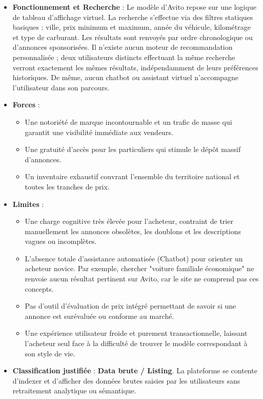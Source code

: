 \documentclass[11pt,a4paper]{article}
\begin{document}
\begin{itemize}
    \item \textbf{Fonctionnement et Recherche} : Le modèle d'Avito repose sur une logique de tableau d'affichage virtuel. La recherche s'effectue via des filtres statiques basiques : ville, prix minimum et maximum, année du véhicule, kilométrage et type de carburant. Les résultats sont renvoyés par ordre chronologique ou d'annonces sponsorisées. Il n'existe aucun moteur de recommandation personnalisée ; deux utilisateurs distincts effectuant la même recherche verront exactement les mêmes résultats, indépendamment de leurs préférences historiques. De même, aucun chatbot ou assistant virtuel n'accompagne l'utilisateur dans son parcours.
    \item \textbf{Forces} : 
    \begin{itemize}
        \item Une notoriété de marque incontournable et un trafic de masse qui garantit une visibilité immédiate aux vendeurs.
        \item Une gratuité d'accès pour les particuliers qui stimule le dépôt massif d'annonces.
        \item Un inventaire exhaustif couvrant l'ensemble du territoire national et toutes les tranches de prix.
    \end{itemize}
    \item \textbf{Limites} :
    \begin{itemize}
        \item Une charge cognitive très élevée pour l'acheteur, contraint de trier manuellement les annonces obsolètes, les doublons et les descriptions vagues ou incomplètes.
        \item L'absence totale d'assistance automatisée (Chatbot) pour orienter un acheteur novice. Par exemple, chercher "voiture familiale économique" ne renvoie aucun résultat pertinent sur Avito, car le site ne comprend pas ces concepts.
        \item Pas d'outil d'évaluation de prix intégré permettant de savoir si une annonce est surévaluée ou conforme au marché.
        \item Une expérience utilisateur froide et purement transactionnelle, laissant l'acheteur seul face à la difficulté de trouver le modèle correspondant à son style de vie.
    \end{itemize}
    \item \textbf{Classification justifiée} : \textbf{Data brute / Listing}. La plateforme se contente d'indexer et d'afficher des données brutes saisies par les utilisateurs sans retraitement analytique ou sémantique.
\end{itemize}
\end{document}

